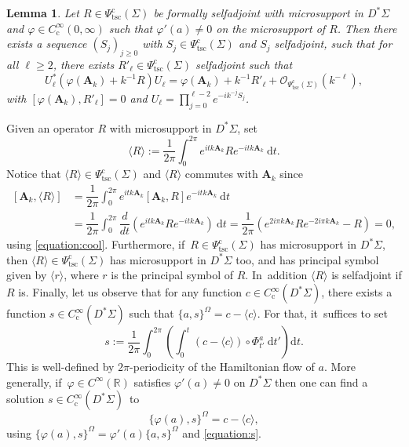 \documentclass[10pt]{amsart}
\newcommand{\bA}{\boldsymbol{A}}
\theoremstyle{plain}
\newtheorem{lemma}[theorem]{Lemma}
\theoremstyle{definition}
\let\mc\mathcal
\newcommand{\R}{\mathbb{R}}
\newcommand{\dd}{\mathrm{d}}
\DeclareMathOperator{\comp}{c}
\begin{document}
\begin{lemma}
\label{lemma:normal-form}
Let $R \in \Psi^{{\comp}}_{\mathrm{tsc}}(\Sigma)$ be formally
selfadjoint with microsupport in $D^*\Sigma$ and $\varphi \in
C^\infty_{{\comp}}(0,\infty)$ such that $\varphi'(a) \neq 0$ on the microsupport of $R$.
Then there exists a sequence $(S_j)_{j \geq 0}$ with $S_j \in
\Psi^{{\comp}}_{\mathrm{tsc}}(\Sigma)$ and $S_j$ selfadjoint, such that
for all $\ell \geq 2$, there exists $R'_\ell \in
\Psi^{{\comp}}_{\mathrm{tsc}}(\Sigma)$ selfadjoint such that
\begin{equation}
\label{equation:prod}
U_{\ell}^* (\varphi(\bA_k) + k^{-1}R) U_{\ell}
= \varphi(\bA_k) + k^{-1}R'_\ell + \mc{O}_{\Psi_{\mathrm{tsc}}^{{\comp}}(\Sigma)}(k^{-\ell}),
\end{equation}
with $[\varphi(\bA_k),R'_\ell]=0$ and $U_{\ell} = \prod_{j=0}^{\ell-2}
e^{-ik^{-j}S_j}$.
\end{lemma}

Given an operator $R$ with microsupport in $D^*\Sigma$, set
\[
\langle R\rangle := \dfrac{1}{2\pi} \int_0^{2\pi} e^{itk\bA_k} R e^{-itk\bA_k} ~ \dd t.
\]
Notice that $\langle R\rangle \in \Psi^{\comp}_{\mathrm{tsc}}(\Sigma)$ and $\langle R \rangle$ commutes with $\bA_k$ since
\[
\begin{split}
[\bA_k, \langle R \rangle ] &= \dfrac{1}{2\pi} \int_0^{2\pi} e^{itk\bA_k} [\bA_k,R]e^{-itk\bA_k} ~ \dd t \\
& = \dfrac{1}{2\pi} \int_0^{2\pi} \dfrac{d}{dt} (e^{itk\bA_k} R e^{-itk\bA_k}) ~ \dd t = \dfrac{1}{2\pi}(e^{2i\pi k\bA_k} Re^{-2i \pi k\bA_k}-R) = 0,
\end{split}
\]
using \eqref{equation:cool}. Furthermore, if~$R \in
\Psi_{\mathrm{tsc}}^{\comp}(\Sigma)$ has microsupport in $D^*\Sigma$, then $\langle R\rangle \in
\Psi_{\mathrm{tsc}}^{\comp}(\Sigma)$ has microsupport in $D^*\Sigma$ too, and has principal symbol given by $\langle
r\rangle$, where $r$ is the principal symbol of $R$. In~addition $\langle
R\rangle$ is selfadjoint if $R$ is. Finally, let us observe that for any function $c \in C^\infty_{{\comp}}(D^*\Sigma)$, there exists a function $s \in C^\infty_{{\comp}}(D^*\Sigma)$ such that $\{a,s\}^\Omega = c-\langle c\rangle$. For that, it~suffices to set
\begin{equation}
\label{equation:s}
s := \dfrac{1}{2\pi} \int_0^{2\pi}\left(\int_0^t (c-\langle c\rangle) \circ \Phi_{t'}^a~ \dd t' \right)\dd t.
\end{equation}
This is well-defined by $2\pi$-periodicity of the Hamiltonian flow of $a$.
More generally, if~$\varphi \in C^\infty(\R)$ satisfies $\varphi'(a) \neq 0$ on $D^*\Sigma$ then one can find a solution $s \in C^\infty_{\comp}(D^*\Sigma)$~to
\begin{equation}
\label{equation:resoluble}
\{\varphi(a),s\}^\Omega = c-\langle c\rangle,
\end{equation}
using $\{\varphi(a),s\}^\Omega = \varphi'(a)\{a,s\}^\Omega$ and \eqref{equation:s}.
\end{document}

